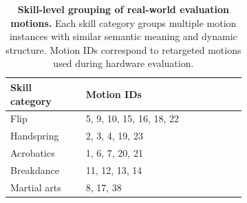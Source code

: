 \begin{table}[t]
\vspace{-1mm}
\centering
\footnotesize
\setlength{\tabcolsep}{6pt}
\renewcommand{\arraystretch}{1.15}
\caption{\textbf{Skill-level grouping of real-world evaluation motions.}
Each skill category groups multiple motion instances with similar
semantic meaning and dynamic structure.
Motion IDs correspond to retargeted motions used during hardware evaluation.}
\label{tab:skill_mapping}

\begin{tabular}{l|p{0.68\linewidth}}
\hline
Skill category & Motion IDs \\
\hline
Flip &
5, 9, 10, 15, 16, 18, 22
\\

Handspring &
2, 3, 4, 19, 23
\\

Acrobatics &
1, 6, 7, 20, 21
\\

Breakdance &
11, 12, 13, 14
\\

Martial arts &
8, 17, 38

\\
\hline
\end{tabular}
\vspace{-2mm}
\end{table}
